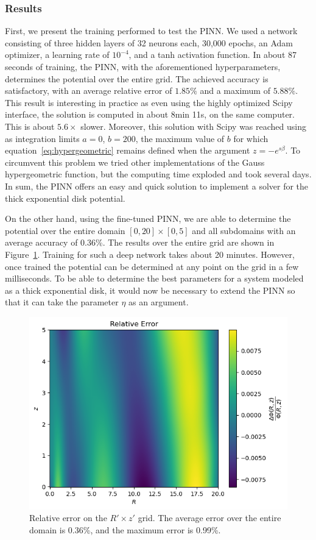 \subsubsection{Results}

First, we present the training performed to test the PINN. We used a network consisting of three hidden layers of 32 neurons each, 30,000 epochs, an Adam optimizer, a learning rate of $10^{-4}$, and a tanh activation function. In about 87 seconds of training, the PINN, with the aforementioned hyperparameters, determines the potential over the entire grid. The achieved accuracy is satisfactory, with an average relative error of $1.85\%$ and a maximum of $5.88\%$. This result is interesting in practice as even using the highly optimized Scipy interface, the solution is computed in about 8min 11s, on the same computer. This is about $5.6\times$ slower. Moreover, this solution with Scipy was reached using as integration limits $a=0$, $b=200$, the maximum value of $b$ for which equation~\eqref{eq:hypergeometric} remains defined when the argument $z=-e^{s\beta}$. To circumvent this problem we tried other implementations of the Gauss hypergeometric function, but the computing time exploded and took several days. In sum, the PINN offers an easy and quick solution to implement a solver for the thick exponential disk potential.

On the other hand, using the fine-tuned PINN, we are able to determine the potential over the entire domain $[0, 20] \times [0, 5]$ and all subdomains with an average accuracy of 0.36\%. The results over the entire grid are shown in Figure~\ref{fig:relative-error-expdisc}. Training for such a deep network takes about 20 minutes. However, once trained the potential can be determined at any point on the grid in a few milliseconds. To be able to determine the best parameters for a system modeled as a thick exponential disk, it would now be necessary to extend the PINN so that it can take the parameter $\eta$ as an argument.

\begin{figure}
\centering
\includegraphics[width=\textwidth]{imgs/relative-error-expdisc.png}
\caption{Relative error on the $R' \times z'$ grid. The average error over the entire domain is 0.36\%, and the maximum error is 0.99\%.}
\label{fig:relative-error-expdisc}
\end{figure}

